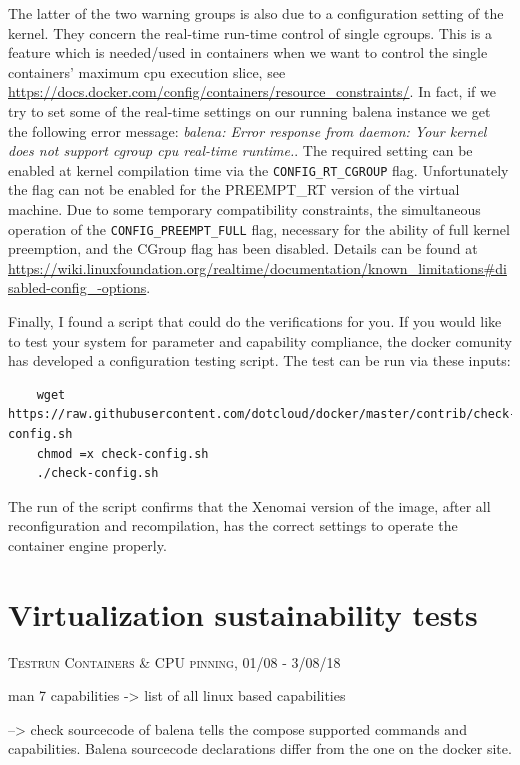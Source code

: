 \documentclass[]{scrartcl}
\begin{document}
The latter of the two warning groups is also due to a configuration setting of the kernel. They concern the real-time run-time control of single cgroups. This is a feature which is needed/used in containers when we want to control the single containers' maximum cpu execution slice, see \url{https://docs.docker.com/config/containers/resource_constraints/}. 
In fact, if we try to set some of the real-time settings on our running balena instance we get the following error message: \textit{balena: Error response from daemon: Your kernel does not support cgroup cpu real-time runtime.}.
The required setting can be enabled at kernel compilation time via the \texttt{CONFIG\_RT\_CGROUP} flag. 
Unfortunately the flag can not be enabled for the PREEMPT\_RT version of the virtual machine. Due to some temporary compatibility constraints, the simultaneous operation of the \texttt{CONFIG\_PREEMPT\_FULL} flag, necessary for the ability of full kernel preemption, and the CGroup flag has been disabled. Details can be found at \url{https://wiki.linuxfoundation.org/realtime/documentation/known_limitations#disabled-config_-options}.

Finally, I found a script that could do the verifications for you. If you would like to test your system for parameter and capability compliance, the docker comunity has developed a configuration testing script. The test can be run via these inputs:

\begin{verbatim}
	wget https://raw.githubusercontent.com/dotcloud/docker/master/contrib/check-config.sh
	chmod =x check-config.sh
	./check-config.sh
\end{verbatim}

The run of the script confirms that the Xenomai version of the image, after all reconfiguration and recompilation, has the correct settings to operate the container engine properly.

\section{Virtualization sustainability tests}

{\small\textsc{Testrun Containers \& CPU pinning, 01/08 - 3/08/18} \bigskip}



man 7 capabilities  -> list of all linux based capabilities

--> check sourcecode of balena tells the compose supported commands and capabilities. Balena sourcecode declarations differ from the one on the docker site.
\end{document}

